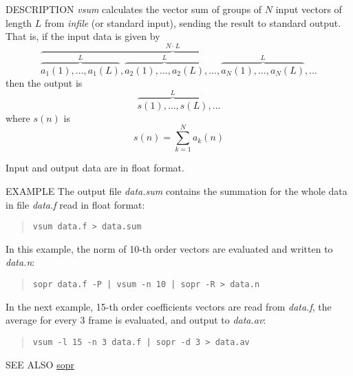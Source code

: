 \begin{synopsis}
\item[vsum] [ --l $L$ ] [ --n $N$ ] [ {\em infile} ]
\end{synopsis}

\begin{qsection}{DESCRIPTION}
{\em vsum} calculates the vector sum of groups of $N$ input vectors 
of length $L$ from {\em infile} (or standard input), 
sending the result to standard output.
That is, if the input data is given by
\begin{displaymath}
\overbrace{
  \overbrace{a_1(1),\dots,a_1(L)}^{L},
  \overbrace{a_2(1),\dots,a_2(L)}^{L},\dots,
  \overbrace{a_N(1),\dots,a_N(L)}^{L}
}^{N \cdot L},\dots
\end{displaymath}
then the output is 
\begin{displaymath}
  \overbrace{s(1),\dots,s(L)}^{L},\dots
\end{displaymath}
where $s(n)$ is
\begin{displaymath}
  s(n)=\sum_{k=1}^{N} a_k(n)
\end{displaymath}

Input and output data are in float format.
\end{qsection}

\begin{options}
\end{options}

\begin{qsection}{EXAMPLE}
The output file {\em data.sum} contains the summation for
the whole data in file {\em data.f} read in float format:
\begin{quote}
  \verb!vsum data.f > data.sum!
\end{quote}
\par
In this example, the norm of 10-th order vectors are
evaluated and written to {\em data.n}:
\begin{quote}
  \verb!sopr data.f -P | vsum -n 10 | sopr -R > data.n!
\end{quote}
\par
In the next example, 15-th order coefficients vectors are read
from {\em data.f}, the average for every 3 frame is evaluated,
and output to {\em data.av}:
\begin{quote}
  \verb!vsum -l 15 -n 3 data.f | sopr -d 3 > data.av!
\end{quote}
\end{qsection}

\begin{qsection}{SEE ALSO}
\hyperlink{sopr}{sopr}
\end{qsection}
